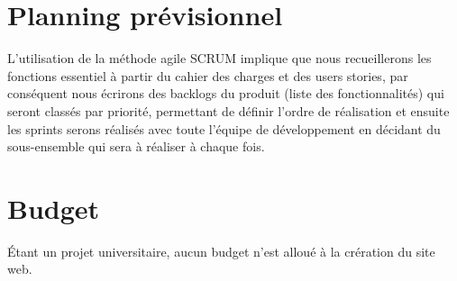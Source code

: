\documentclass[oneside]{report}
\begin{document}
	\chapter{Planning prévisionnel}
	{
		\par L'utilisation de la méthode agile SCRUM implique que nous recueillerons les fonctions essentiel à partir du cahier des charges et des users stories, par conséquent nous écrirons des backlogs du produit (liste des fonctionnalités) qui seront classés par priorité, permettant de définir l'ordre de réalisation et ensuite les sprints serons réalisés avec toute l'équipe de développement en décidant du sous-ensemble qui sera à réaliser à chaque fois.
	}

	\chapter{Budget}
	{
		\par Étant un projet universitaire, aucun budget n'est alloué à la crération du site web.
	}
\end{document}
